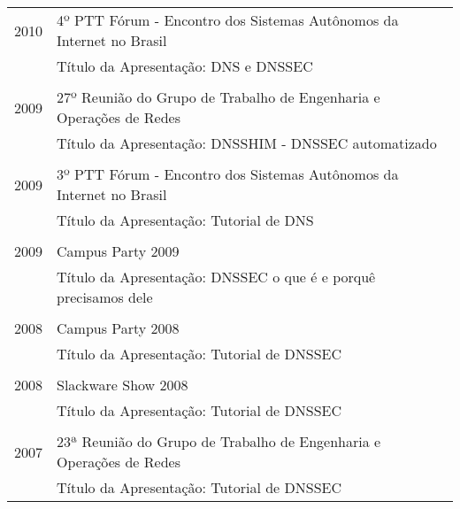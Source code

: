 \documentclass[a4paper, oneside, final]{scrartcl}
\begin{document}
\begin{center}
\begin{tabularx}{0.97\linewidth}{p{1.4cm}X}
2010        & 4º PTT Fórum - Encontro dos Sistemas Autônomos da Internet no Brasil\\
            & Título da Apresentação: DNS e DNSSEC\\ \\

2009        & 27º Reunião do Grupo de Trabalho de Engenharia e Operações de Redes\\
            & Título da Apresentação: DNSSHIM - DNSSEC automatizado\\ \\

2009        & 3º PTT Fórum - Encontro dos Sistemas Autônomos da Internet no Brasil\\
            & Título da Apresentação: Tutorial de DNS\\ \\

2009        & Campus Party 2009\\
            & Título da Apresentação: DNSSEC o que é e porquê precisamos dele\\ \\

2008        & Campus Party 2008\\
            & Título da Apresentação: Tutorial de DNSSEC\\ \\

2008        & Slackware Show 2008\\
            & Título da Apresentação: Tutorial de DNSSEC\\ \\

2007        & 23ª Reunião do Grupo de Trabalho de Engenharia e Operações de Redes\\
            & Título da Apresentação: Tutorial de DNSSEC
\end{tabularx}


\end{center}
\end{document}
